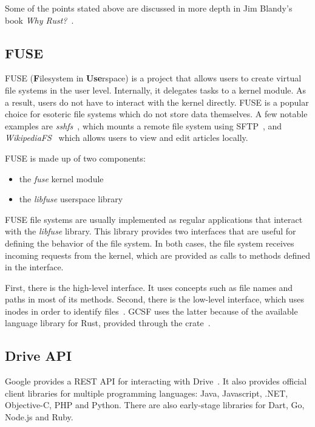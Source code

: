 Some of the points stated above are discussed in more depth in Jim Blandy's book \emph{Why Rust?}~\cite{why_rust}.

\subsection{FUSE}

FUSE (\textbf{F}ilesystem in \textbf{Use}rspace) is a project that allows users to create virtual file systems in the user level. Internally, it delegates tasks to a kernel module. As a result, users do not have to interact with the kernel directly. FUSE is a popular choice for esoteric file systems which do not store data themselves. A few notable examples are \emph{sshfs}~\cite{sshfs}, which mounts a remote file system using SFTP~\cite{sftp}, and \emph{WikipediaFS}~\cite{wikipediafs} which allows users to view and edit articles locally.

FUSE is made up of two components:
\begin{itemize}
  \itemsep0em
  \item the \textit{fuse} kernel module
  \item the \textit{libfuse} userspace library
\end{itemize}

FUSE file systems are usually implemented as regular applications that interact with the \textit{libfuse} library. This library provides two interfaces that are useful for defining the behavior of the file system. In both cases, the file system receives incoming requests from the kernel, which are provided as calls to methods defined in the interface.

First, there is the high-level interface. It uses concepts such as file names and paths in most of its methods. Second, there is the low-level interface, which uses inodes in order to identify files~\cite{tanenbaum}. GCSF uses the latter because of the available language library for Rust, provided through the  crate~\cite{fuse_crate}.

\subsection{Drive API}

Google provides a REST API for interacting with Drive~\cite{google_drive_rest_api_overview}. It also provides official client libraries for multiple programming languages: Java, Javascript, .NET, Objective-C, PHP and Python. There are also early-stage libraries for Dart, Go, Node.js and Ruby.

